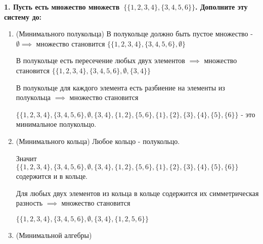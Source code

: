 \documentclass{article}
\begin{document}
\noindent \textbf{1. Пусть есть множество множеств $\{\{1,2,3,4\},\{3,4,5,6\}\}$. Дополните эту систему до:}

\begin{enumerate}

\item(Минимального полукольца) В полукольце должно быть пустое множество - $\emptyset \implies$ множество становится $\{\{1,2,3,4\},\{3,4,5,6\}, \emptyset\}$

В полукольце есть пересечение любых двух элементов $\implies$ множество становится $\{\{1,2,3,4\},\{3,4,5,6\}, \emptyset, \{3,4\}\}$

В полукольце для каждого элемента есть разбиение на элементы из полукольца $\implies$ множество становится 

$\{\{1,2,3,4\},\{3,4,5,6\}, \emptyset, \{3,4\}, \{1,2\}, \{5,6\}, \{1\}, \{2\}, \{3\}, \{4\}, \{5\}, \{6\}\}$ - это минимальное полукольцо.

\item(Минимального кольца) Любое кольцо - полукольцо. 

Значит $\{\{1,2,3,4\},\{3,4,5,6\}, \emptyset, \{3,4\}, \{1,2\}, \{5,6\}, \{1\}, \{2\}, \{3\}, \{4\}, \{5\}, \{6\}\}$ содержится и в кольце.

Для любых двух элементов из кольца в кольце содержится их симметрическая разность $\implies$ множество становится 

$\{\{1,2,3,4\},\{3,4,5,6\}, \emptyset, \{3,4\}, \{1,2,5,6\}\}$
\item(Минимальной алгебры)

\end{enumerate}
\end{document}
